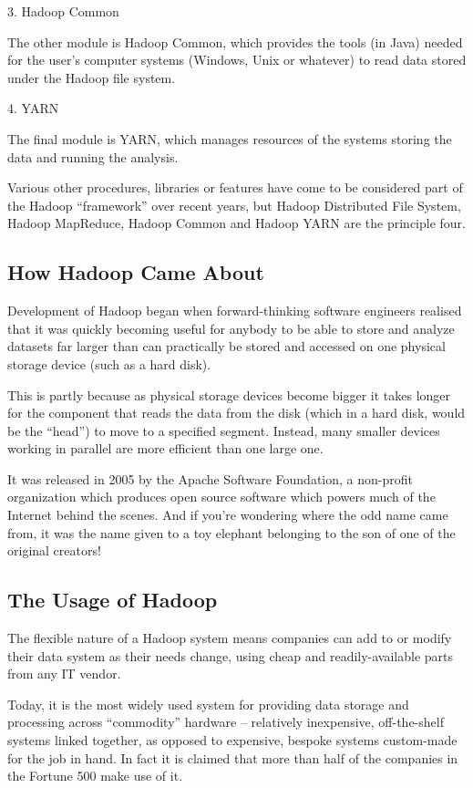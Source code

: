 \documentclass[11pt]{article} %
\begin{document}
3. Hadoop Common

The other module is Hadoop Common, which provides the tools (in Java) needed for the user’s computer systems (Windows, Unix or whatever) to read data stored under the Hadoop file system.

4. YARN

The final module is YARN, which manages resources of the systems storing the data and running the analysis.

Various other procedures, libraries or features have come to be considered part of the Hadoop “framework” over recent years, but Hadoop Distributed File System, Hadoop MapReduce, Hadoop Common and Hadoop YARN are the principle four.

\subsection{How Hadoop Came About}

Development of Hadoop began when forward-thinking software engineers realised that it was quickly becoming useful for anybody to be able to store and analyze datasets far larger than can practically be stored and accessed on one physical storage device (such as a hard disk).

This is partly because as physical storage devices become bigger it takes longer for the component that reads the data from the disk (which in a hard disk, would be the “head”) to move to a specified segment. Instead, many smaller devices working in parallel are more efficient than one large one.

It was released in 2005 by the Apache Software Foundation, a non-profit organization which produces open source software which powers much of the Internet behind the scenes. And if you’re wondering where the odd name came from, it was the name given to a toy elephant belonging to the son of one of the original creators!

\subsection{The Usage of Hadoop}

The flexible nature of a Hadoop system means companies can add to or modify their data system as their needs change, using cheap and readily-available parts from any IT vendor.

Today, it is the most widely used system for providing data storage and processing across “commodity” hardware – relatively inexpensive, off-the-shelf systems linked together, as opposed to expensive, bespoke systems custom-made for the job in hand. In fact it is claimed that more than half of the companies in the Fortune 500 make use of it.
\end{document}
